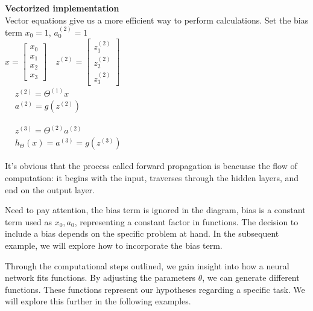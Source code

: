 \documentclass{article}
\begin{document}
    \begin{mdframed}[hidealllines=false,backgroundcolor=white!20]
        \textbf{Vectorized implementation}\\

        Vector equations give us a more efficient way to perform calculations.
        Set the bias term $x_0 = 1$, $a_0^{(2)}=1$\\


        $x=\left[\begin{array}{l}x_0 \\ x_1 \\ x_2 \\ x_3\end{array}\right] \quad z^{(2)}=\left[\begin{array}{c}z_1^{(2)} \\ z_2^{(2)} \\ z_3^{(2)}\end{array}\right]$ \\

        $\begin{aligned} & z^{(2)}=\Theta^{(1)} x \\ & a^{(2)}=g\left(z^{(2)}\right)\end{aligned}$

        $
        \begin{aligned}
        & z^{(3)}=\Theta^{(2)} a^{(2)} \\
        & h_{\Theta}(x)=a^{(3)}=g\left(z^{(3)}\right)
        \end{aligned}
        $

        \hspace*{\fill}

    \end{mdframed}

    It's obvious that the process called forward propagation is beacuase the flow of computation: it begins with the input, traverses through the hidden layers, and end on the output layer.

Need to pay attention, the bias term is ignored in the diagram, bias is a constant term used as $x_0, a_0$, representing a constant factor in functions. The decision to include a bias depends on the specific problem at hand. In the subsequent example, we will explore how to incorporate the bias term.

Through the computational steps outlined, we gain insight into how a neural network fits functions. By adjusting the parameters $\theta$, we can generate different functions. These functions represent our hypotheses regarding a specific task.  We will explore this further in the following examples.
\end{document}
